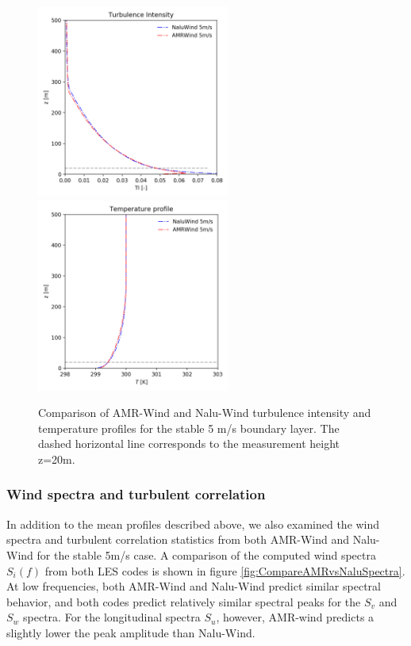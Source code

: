 \begin{figure} %
  \centering
  \includegraphics[width=2.5in]{figures/Compare_AMRWind_NaluWind/AMRWind_NaluWind_stable_05ms_mesh2p5_2p5_2p5_TI.png}
  \includegraphics[width=2.5in]{figures/Compare_AMRWind_NaluWind/AMRWind_NaluWind_stable_05ms_mesh2p5_2p5_2p5_T.png}
  \caption{\label{fig:CompareAMRvsNaluWind_TTI} Comparison of AMR-Wind
    and Nalu-Wind turbulence intensity and temperature profiles for
    the stable 5 m/s boundary layer. The dashed horizontal line
    corresponds to the measurement height z=20m.}
\end{figure}

\subsubsection{Wind spectra and turbulent correlation}

In addition to the mean profiles described above, we also examined the
wind spectra and turbulent correlation statistics from both AMR-Wind
and Nalu-Wind for the stable 5m/s case.  A comparison of the computed
wind spectra $S_i(f)$ from both LES codes is shown in figure
\ref{fig:CompareAMRvsNaluSpectra}.  At low frequencies, both AMR-Wind
and Nalu-Wind predict similar spectral behavior, and both codes
predict relatively similar spectral peaks for the $S_v$ and $S_w$
spectra.  For the longitudinal spectra $S_u$, however, AMR-wind
predicts a slightly lower the peak amplitude than Nalu-Wind.

